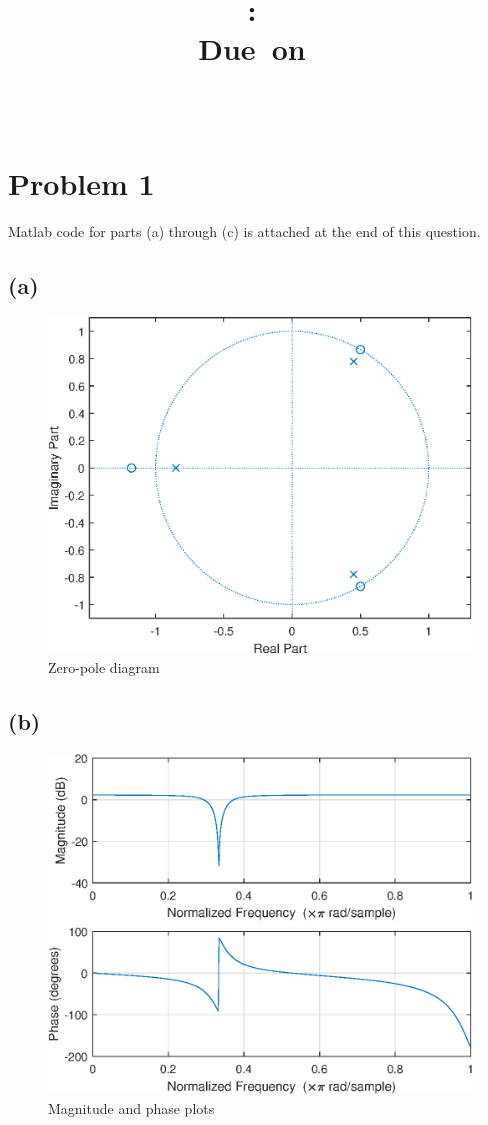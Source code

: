 \documentclass{article}
\title{
\vspace{2in}
\textmd{\textbf{\hmwkClass:\ \hmwkTitle}}\\
\normalsize\vspace{0.1in}\small{Due\ on\ \hmwkDueDate}\\
\vspace{0.1in}\large{\textit{\hmwkClassInstructor\ \hmwkClassTime}}
\vspace{3in}
}
\author{\textbf{\hmwkAuthorName}}
\date{} %
\begin{document}
	
\section{Problem 1}

Matlab code for parts (a) through (c) is attached at the end of this question.

\subsection{(a)}

\FloatBarrier
\begin{figure}[h!]
	\centering
	\includegraphics[scale=0.7]{figs/hw4q1a_pole_zero.eps}
	\caption{Zero-pole diagram}
\end{figure}
\FloatBarrier

\subsection{(b)}

\FloatBarrier
\begin{figure}[h!]
	\centering
	\includegraphics[scale=0.7]{figs/hw4q1b_mag_phase.eps}
	\caption{Magnitude and phase plots}
\end{figure}
\FloatBarrier
\end{document}
